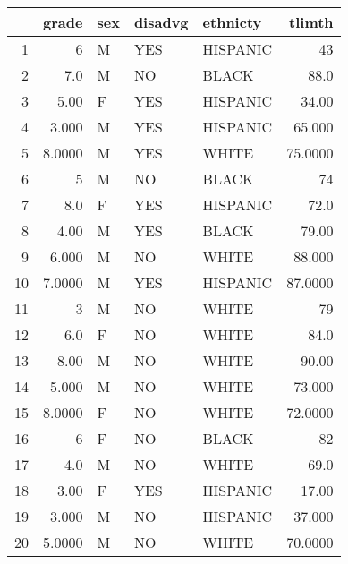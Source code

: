 \begin{table}[ht]
\centering
\begin{tabular}{rrlllr}
  \hline
 & grade & sex & disadvg & ethnicty & tlimth \\ 
  \hline
1 & 6 & M & YES & HISPANIC & 43 \\ 
  2 & 7.0 & M & NO & BLACK & 88.0 \\ 
  3 & 5.00 & F & YES & HISPANIC & 34.00 \\ 
  4 & 3.000 & M & YES & HISPANIC & 65.000 \\ 
  5 & 8.0000 & M & YES & WHITE & 75.0000 \\ 
  6 & 5 & M & NO & BLACK & 74 \\ 
  7 & 8.0 & F & YES & HISPANIC & 72.0 \\ 
  8 & 4.00 & M & YES & BLACK & 79.00 \\ 
  9 & 6.000 & M & NO & WHITE & 88.000 \\ 
  10 & 7.0000 & M & YES & HISPANIC & 87.0000 \\ 
  11 & 3 & M & NO & WHITE & 79 \\ 
  12 & 6.0 & F & NO & WHITE & 84.0 \\ 
  13 & 8.00 & M & NO & WHITE & 90.00 \\ 
  14 & 5.000 & M & NO & WHITE & 73.000 \\ 
  15 & 8.0000 & F & NO & WHITE & 72.0000 \\ 
  16 & 6 & F & NO & BLACK & 82 \\ 
  17 & 4.0 & M & NO & WHITE & 69.0 \\ 
  18 & 3.00 & F & YES & HISPANIC & 17.00 \\ 
  19 & 3.000 & M & NO & HISPANIC & 37.000 \\ 
  20 & 5.0000 & M & NO & WHITE & 70.0000 \\ 
   \hline
\end{tabular}
\end{table}
